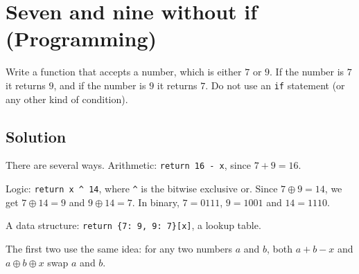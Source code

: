 \section {Seven and nine without if (Programming)}

Write a function that accepts a number, which is either $7$ or $9$. If the number is $7$ it returns $9$, and if the number is $9$ it returns $7$.
Do not use an \verb|if| statement (or any other kind of condition).

\subsection{Solution}

There are several ways. Arithmetic: \verb|return 16 - x|, since $7+9 = 16$.

Logic: \verb|return x ^ 14|, where \verb|^| is the bitwise exclusive or. Since $7 \oplus 9 = 14$,
we get $7 \oplus 14 = 9$ and $9 \oplus 14 = 7$. In binary, $7 = 0111$, $9 = 1001$ and $14 = 1110$.

A data structure: \verb|return {7: 9, 9: 7}[x]|, a lookup table.

The first two use the same idea: for any two numbers $a$ and $b$, both $a + b - x$ and $a \oplus b \oplus x$ swap $a$ and $b$.
